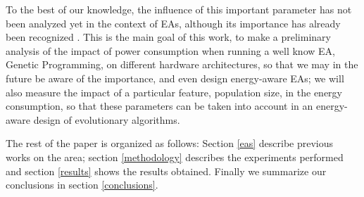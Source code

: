 To the best of our knowledge, the influence of this important
parameter has not been analyzed yet in the context of EAs, although
its importance has already been recognized \cite{ephemeral}.  This is
the main goal of this work, to make a preliminary analysis of the
impact of power consumption when running a well know EA, Genetic
Programming, on different hardware architectures, so that we may in
the future be aware of the 
importance, and even design energy-aware EAs; we will also measure the
impact of a particular feature, population size, in the energy
consumption, so that these parameters can be taken into account in an
energy-aware design of evolutionary algorithms. 

The rest of the paper is organized as follows:  Section \ref{eas}
describe previous works on the area;  section \ref{methodology}
describes the experiments performed and section \ref{results} shows
the results obtained.  Finally we summarize our conclusions in section
\ref{conclusions}. 


